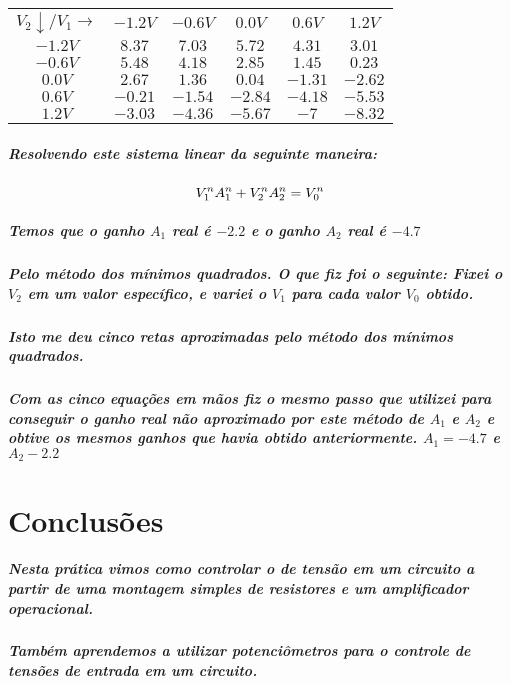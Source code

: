 \documentclass[12pt,twoside, a4paper, twocolumn]{article}
\begin{document}
\begin{center}
    \begin{tabular}{ |c|ccccc| }
        \hline
        $V_2 \downarrow / V_1 \rightarrow $ & $-1.2V$ & $-0.6V$ & $0.0V$  & $0.6V$  & $1.2V$  \\
        $-1.2V$                             & $8.37$  & $7.03$  & $5.72$  & $4.31$  & $3.01$  \\
        $ -0.6V$                            & $5.48$  & $4.18$  & $2.85$  & $1.45$  & $0.23$  \\
        $0.0V$                              & $2.67$  & $1.36$  & $0.04$  & $-1.31$ & $-2.62$ \\
        $ 0.6V$                             & $-0.21$ & $-1.54$ & $-2.84$ & $-4.18$ & $-5.53$ \\
        $ 1.2V$                             & $-3.03$ & $-4.36$ & $-5.67$ & $-7$    & $-8.32$ \\
        \hline
    \end{tabular}
\end{center}

\subparagraph*{Resolvendo este sistema linear da seguinte maneira:}

\begin{equation}
    V_1^n A_1^n + V_2^n A_2^n = V_0^n \\
\end{equation}


\subparagraph*{Temos que o ganho $A_1$ real é $-2.2$ e o ganho $A_2$ real é $-4.7$}

\subparagraph*{Pelo método dos mínimos quadrados. O que fiz foi o seguinte: Fixei o $V_2$ em um valor específico, e variei o $V_1$ para cada valor $V_0$ obtido.}

\subparagraph*{Isto me deu cinco retas aproximadas pelo método dos mínimos quadrados.}

\subparagraph*{Com as cinco equações em mãos fiz o mesmo passo que utilizei para conseguir o ganho real não aproximado por este método de $A_1$ e $A_2$ e obtive os mesmos ganhos que havia obtido anteriormente. $A_1 = -4.7$ e $A_2 -2.2$}



\section{Conclusões}

\subparagraph*{Nesta prática vimos como controlar o de tensão em um circuito a partir de uma montagem simples de resistores e um amplificador operacional.}

\subparagraph*{Também aprendemos a utilizar potenciômetros para o controle de tensões de entrada em um circuito.}
\end{document}

